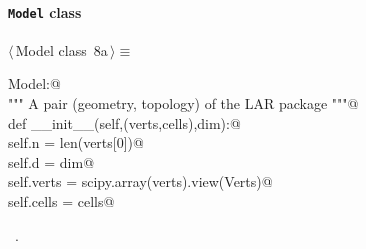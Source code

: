 \documentclass[11pt,oneside]{article}	%
\begin{document}
\paragraph{\texttt{Model} class}
\begin{flushleft} \small \label{scrap23}
\protect{}$\langle\,$Model class\nobreak\ {\footnotesize 8a}$\,\rangle\equiv$
\vspace{-1ex}
\begin{list}{}{} \item
\mbox{}\verb@class Model:@\\
\mbox{}\verb@   """ A pair (geometry, topology) of the LAR package """@\\
\mbox{}\verb@   def __init__(self,(verts,cells),dim):@\\
\mbox{}\verb@      self.n = len(verts[0])@\\
\mbox{}\verb@      self.d = dim@\\
\mbox{}\verb@      self.verts = scipy.array(verts).view(Verts)@\\
\mbox{}\verb@      self.cells = cells@\\
\mbox{}\verb@@{\NWsep}
\end{list}
\vspace{-1ex}
\footnotesize\addtolength{\baselineskip}{-1ex}
\begin{list}{}{\setlength{\itemsep}{-\parsep}\setlength{\itemindent}{-\leftmargin}}
\item \NWtxtMacroRefIn\ .
\end{list}
\end{flushleft}
\end{document}
